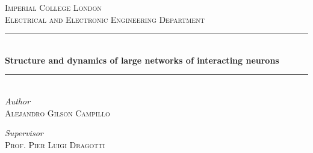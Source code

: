 \documentclass[11pt]{article}
\begin{document}
\begin{titlepage} %
	\newcommand{\HRule}{\rule{\linewidth}{0.5mm}} %
	
	\center %
	
	
	\textsc{\LARGE Imperial College London}\\[1.5cm] %
	
	\textsc{\Large Electrical and Electronic Engineering Department}\\[0.5cm] %
	
	
	\HRule\\[0.4cm]
	
	{\huge\bfseries Structure and dynamics of large networks of interacting neurons}\\[0.4cm] %
	
	\HRule\\[1.5cm]
	
	
	
	
	
	
	{\large\textit{Author}}\\
	\textsc{Alejandro Gilson Campillo} \quad {} %
	
	\vfill
	
	
	{\large\textit{Supervisor}}\\
	\textsc{Prof. Pier Luigi Dragotti} 
	

\end{titlepage}
\end{document}
